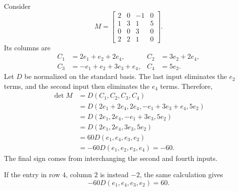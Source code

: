 \begin{example}
  \label{ex:linear-algebra-i:sparse-determinant}
  Consider
  \[
    M=\begin{bmatrix}
      2&0&-1&0\\
      1&3&1&5\\
      0&0&3&0\\
      2&2&1&0
    \end{bmatrix}.
  \]
  Its columns are
  \[
    \begin{aligned}
      C_1&=2e_1+e_2+2e_4,& C_2&=3e_2+2e_4,\\
      C_3&=-e_1+e_2+3e_3+e_4,& C_4&=5e_2.
    \end{aligned}
  \]
  Let \(D\) be normalized on the standard basis. The last input
  eliminates the \(e_2\) terms, and the second input then eliminates
  the \(e_4\) terms. Therefore,
  \begin{align*}
    \det M
      &=D(C_1,C_2,C_3,C_4)\\
      &=D(2e_1+2e_4,2e_4,-e_1+3e_3+e_4,5e_2)\\
      &=D(2e_1,2e_4,-e_1+3e_3,5e_2)\\
      &=D(2e_1,2e_4,3e_3,5e_2)\\
      &=60D(e_1,e_4,e_3,e_2)\\
      &=-60D(e_1,e_2,e_3,e_4)=-60.
  \end{align*}
  The final sign comes from interchanging the second and fourth inputs.

  If the entry in row \(4\), column \(2\) is instead \(-2\), the
  same calculation gives
  \[
    -60D(e_1,e_4,e_3,e_2)=60.
  \]
\end{example}
